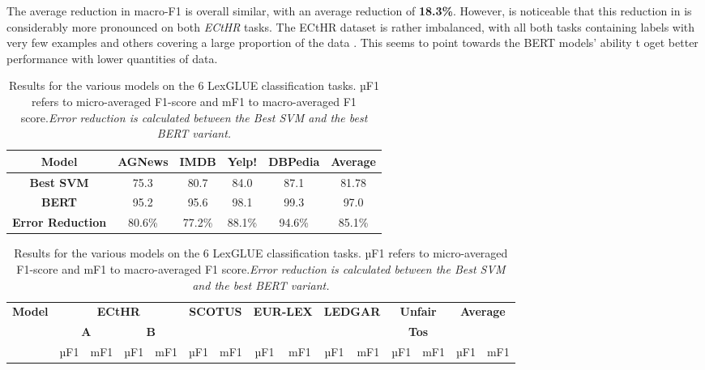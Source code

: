 \documentclass{IOS-Book-Article}
\begin{document}
The average reduction in macro-F1 is overall similar, with an average reduction of \textbf{18.3\%}. However, is noticeable that this reduction in is considerably more pronounced on both \textit{ECtHR} tasks. The ECtHR dataset is rather imbalanced, with all both tasks containing labels with very few examples and others covering a large proportion of the data \cite{lexglue}. This seems to point towards the BERT models' ability t oget better performance with lower quantities of data.


\begin{table}[]
\caption{Results for the best performing model of each kind on a variety of General Domain (GD). \textit{Error reduction is calculated between the Best SVM and the best BERT variant.}}
\begin{tabular}{|c|c|c|c|c|c|}
\hline
\textbf{Model}           & \textbf{AGNews} & \textbf{IMDB} & \textbf{Yelp!} & \textbf{DBPedia} & \textbf{Average} \\ \hline
\textbf{Best SVM}        & 75.3            & 80.7          & 84.0           & 87.1             & 81.78            \\ \hline
\textbf{BERT}            & 95.2            & 95.6          & 98.1           & 99.3             & 97.0            \\ \hline
\textbf{Error Reduction} & 80.6\%          & 77.2\%        & 88.1\%         & 94.6\%           & 85.1\%          \\ \hline
\end{tabular}
\bigskip
\caption{Results for the various models on the 6 LexGLUE classification tasks. µF1 refers to micro-averaged F1-score and mF1 to macro-averaged F1 score.\textit{Error reduction is calculated between the Best SVM and the best BERT variant.}}
\hspace*{-\textwidth}\begin{tabular}{|l|ccc|c|cc|cc|cc|c|c|cc|}
\hline
\textbf{Model} & \multicolumn{4}{c|}{\textbf{ECtHR}} & \multicolumn{2}{c|}{\textbf{SCOTUS}} & \multicolumn{2}{c|}{\textbf{EUR-LEX}} & \multicolumn{2}{c|}{\textbf{LEDGAR}} & \multicolumn{2}{c|}{\textbf{Unfair}} & \multicolumn{2}{c|}{\textbf{Average}} \\
 & \multicolumn{2}{c}{\textbf{A}} & \multicolumn{2}{c|}{\textbf{B}} & \multicolumn{1}{l}{} & \multicolumn{1}{l|}{} & \multicolumn{1}{l}{} & \multicolumn{1}{l|}{} & \multicolumn{1}{l}{} & \multicolumn{1}{l|}{} & \multicolumn{2}{c|}{\textbf{Tos}} & \multicolumn{1}{l}{} & \multicolumn{1}{l|}{} \\ \hline
 & \multicolumn{1}{c|}{µF1} & \multicolumn{1}{c|}{mF1} & µF1 & mF1 & \multicolumn{1}{c|}{µF1} & mF1 & \multicolumn{1}{c|}{µF1} & mF1 & \multicolumn{1}{c|}{µF1} & mF1 & µF1 & mF1 & \multicolumn{1}{c|}{µF1} & mF1 \\ \hline

\end{tabular}
\end{table}
\end{document}
